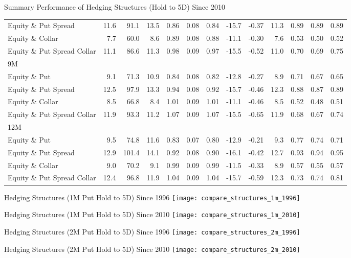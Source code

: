 \documentclass{beamer}
\begin{document}
\begin{frame}{\normalsize Summary Performance of Hedging Structures (Hold to 5D) Since 2010}
{\begin{tabular}{lrrrrrrrrrrrr}
Equity \& Put Spread & 11.6 & 91.1 & 13.5 & 0.86 & 0.08 & 0.84 & -15.7 & -0.37 & 11.3 & 0.89 & 0.89 & 0.89\\
Equity \& Collar & 7.7 & 60.0 & 8.6 & 0.89 & 0.08 & 0.88 & -11.1 & -0.30 & 7.6 & 0.53 & 0.50 & 0.52\\
Equity \& Put Spread Collar & 11.1 & 86.6 & 11.3 & 0.98 & 0.09 & 0.97 & -15.5 & -0.52 & 11.0 & 0.70 & 0.69 & 0.75\\
\midrule
9M \\
\midrule
Equity \& Put & 9.1 & 71.3 & 10.9 & 0.84 & 0.08 & 0.82 & -12.8 & -0.27 & 8.9 & 0.71 & 0.67 & 0.65\\
Equity \& Put Spread & 12.5 & 97.9 & 13.3 & 0.94 & 0.08 & 0.92 & -15.7 & -0.46 & 12.3 & 0.88 & 0.87 & 0.89\\
Equity \& Collar & 8.5 & 66.8 & 8.4 & 1.01 & 0.09 & 1.01 & -11.1 & -0.46 & 8.5 & 0.52 & 0.48 & 0.51\\
Equity \& Put Spread Collar & 11.9 & 93.3 & 11.2 & 1.07 & 0.09 & 1.07 & -15.5 & -0.65 & 11.9 & 0.68 & 0.67 & 0.74\\
\midrule
12M \\
\midrule
Equity \& Put & 9.5 & 74.8 & 11.6 & 0.83 & 0.07 & 0.80 & -12.9 & -0.21 & 9.3 & 0.77 & 0.74 & 0.71\\
Equity \& Put Spread & 12.9 & 101.4 & 14.1 & 0.92 & 0.08 & 0.90 & -16.1 & -0.42 & 12.7 & 0.93 & 0.94 & 0.95\\
Equity \& Collar & 9.0 & 70.2 & 9.1 & 0.99 & 0.09 & 0.99 & -11.5 & -0.33 & 8.9 & 0.57 & 0.55 & 0.57\\
Equity \& Put Spread Collar & 12.4 & 96.8 & 11.9 & 1.04 & 0.09 & 1.04 & -15.7 & -0.59 & 12.3 & 0.73 & 0.74 & 0.81\\
\bottomrule
\end{tabular}
}
\end{frame}

\begin{frame}{Hedging Structures (1M Put Hold to 5D) Since 1996}
\texttt{[image: compare\_structures\_1m\_1996]}
\end{frame}
\begin{frame}{Hedging Structures (1M Put Hold to 5D) Since 2010}
\texttt{[image: compare\_structures\_1m\_2010]}
\end{frame}

\begin{frame}{Hedging Structures (2M Put Hold to 5D) Since 1996}
\texttt{[image: compare\_structures\_2m\_1996]}
\end{frame}
\begin{frame}{Hedging Structures (2M Put Hold to 5D) Since 2010}
\texttt{[image: compare\_structures\_2m\_2010]}
\end{frame}
\end{document}
